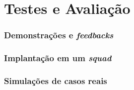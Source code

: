 \chapter{Testes e Avaliação}
    \subsection{Demonstrações e \textit{feedbacks}} %
    \subsection{Implantação em um \textit{squad}} %
    \subsection{Simulações de casos reais} %